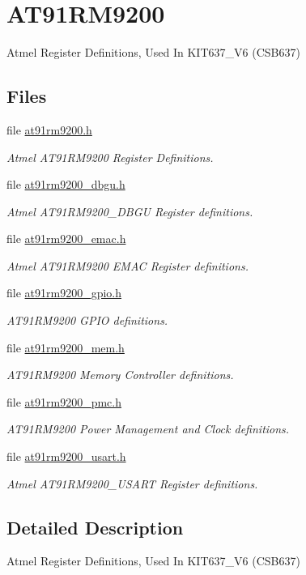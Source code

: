 \hypertarget{group__csb337__at91rm9200}{}\section{A\+T91\+R\+M9200}
\label{group__csb337__at91rm9200}


Atmel Register Definitions, Used In K\+I\+T637\+\_\+\+V6 (C\+S\+B637)  


\subsection*{Files}
\begin{DoxyCompactItemize}
\item 
file \mbox{\hyperlink{at91rm9200_8h}{at91rm9200.\+h}}
\begin{DoxyCompactList}\small\item\em Atmel A\+T91\+R\+M9200 Register Definitions. \end{DoxyCompactList}\item 
file \mbox{\hyperlink{at91rm9200__dbgu_8h}{at91rm9200\+\_\+dbgu.\+h}}
\begin{DoxyCompactList}\small\item\em Atmel A\+T91\+R\+M9200\+\_\+\+D\+B\+GU Register definitions. \end{DoxyCompactList}\item 
file \mbox{\hyperlink{at91rm9200__emac_8h}{at91rm9200\+\_\+emac.\+h}}
\begin{DoxyCompactList}\small\item\em Atmel A\+T91\+R\+M9200 E\+M\+AC Register definitions. \end{DoxyCompactList}\item 
file \mbox{\hyperlink{at91rm9200__gpio_8h}{at91rm9200\+\_\+gpio.\+h}}
\begin{DoxyCompactList}\small\item\em A\+T91\+R\+M9200 G\+P\+IO definitions. \end{DoxyCompactList}\item 
file \mbox{\hyperlink{at91rm9200__mem_8h}{at91rm9200\+\_\+mem.\+h}}
\begin{DoxyCompactList}\small\item\em A\+T91\+R\+M9200 Memory Controller definitions. \end{DoxyCompactList}\item 
file \mbox{\hyperlink{at91rm9200__pmc_8h}{at91rm9200\+\_\+pmc.\+h}}
\begin{DoxyCompactList}\small\item\em A\+T91\+R\+M9200 Power Management and Clock definitions. \end{DoxyCompactList}\item 
file \mbox{\hyperlink{at91rm9200__usart_8h}{at91rm9200\+\_\+usart.\+h}}
\begin{DoxyCompactList}\small\item\em Atmel A\+T91\+R\+M9200\+\_\+\+U\+S\+A\+RT Register definitions. \end{DoxyCompactList}\end{DoxyCompactItemize}


\subsection{Detailed Description}
Atmel Register Definitions, Used In K\+I\+T637\+\_\+\+V6 (C\+S\+B637) 


